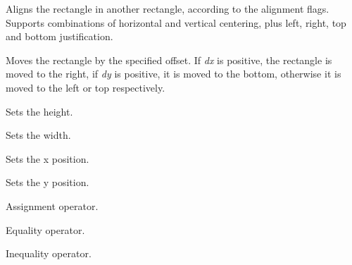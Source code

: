 Aligns the rectangle in another rectangle, according to the alignment flags.
Supports combinations of horizontal and vertical centering, plus left, right,
top and bottom justification.

\label{wxrectoffset}



Moves the rectangle by the specified offset. If {\it dx} is positive, the
rectangle is moved to the right, if {\it dy} is positive, it is moved to the
bottom, otherwise it is moved to the left or top respectively.

\label{wxrectsetheight}


Sets the height.

\label{wxrectsetwidth}


Sets the width.

\label{wxrectsetx}


Sets the x position.

\label{wxrectsety}


Sets the y position.



Assignment operator.



Equality operator.



Inequality operator.

